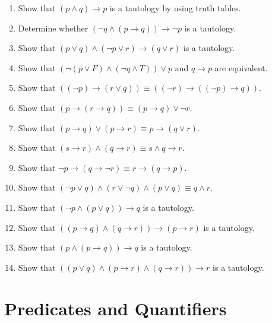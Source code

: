 \documentclass{../../cls/sig-alternate-05-2015}
\begin{document}
\begin{enumerate}
\item Show that $(p \wedge q) \rightarrow p$ is a tautology
by using truth tables.

\item Determine whether $(\neg q \wedge (p \rightarrow q)) \rightarrow \neg p$ is a tautology.

\item Show that $(p \vee q) \wedge (\neg p \vee r) \rightarrow (q \vee r)$ is a tautology.

\item Show that $(\neg(p \vee F) \wedge (\neg q \wedge T)) \vee p$ and $q\rightarrow p$ are equivalent.

\item Show that $((\neg p) \rightarrow (r\vee q)) \equiv ((\neg r)\rightarrow ((\neg p)\rightarrow q))$.

\item Show that $(p \rightarrow (r \rightarrow q))\equiv (p \rightarrow q)\vee \neg r$.

\item Show that $(p \rightarrow q) \vee (p \rightarrow r) \equiv p \rightarrow (q\vee r)$.

\item Show that $(s \rightarrow r) \wedge (q \rightarrow r) \equiv s\wedge q \rightarrow  r$.

\item Show that $\neg p \rightarrow (q \rightarrow \neg r)\equiv r \rightarrow (q \rightarrow p)$.

\item Show that $(\neg p \vee q) \wedge (r \vee \neg q) \wedge (p \vee q) \equiv q\wedge r$.

\item Show that $(\neg p \wedge (p \vee q))\rightarrow q$ is a tautology.

\item Show that $((p\rightarrow q)\wedge (q\rightarrow r)) \rightarrow (p\rightarrow r)$ is a  tautology.

\item Show that $(p\wedge (p \rightarrow q))\rightarrow q$ is a tautology.

\item Show that $((p\vee q)\wedge (p \rightarrow r) \wedge (q\rightarrow r))\rightarrow r$ is a  tautology.
\end{enumerate}

\section{Predicates and Quantifiers}
\end{document}
